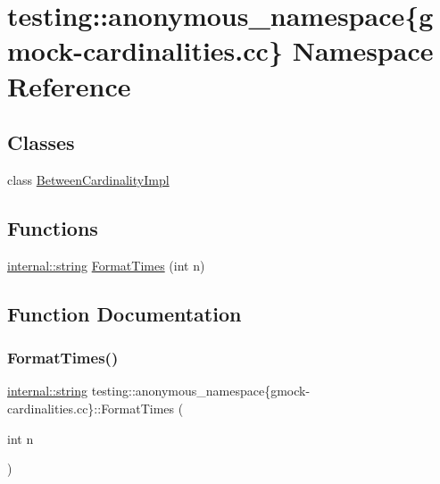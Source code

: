 \hypertarget{namespacetesting_1_1anonymous__namespace_02gmock-cardinalities_8cc_03}{}\section{testing\+:\+:anonymous\+\_\+namespace\{gmock-\/cardinalities.cc\} Namespace Reference}
\label{namespacetesting_1_1anonymous__namespace_02gmock-cardinalities_8cc_03}
\subsection*{Classes}
\begin{DoxyCompactItemize}
\item 
class \hyperlink{classtesting_1_1anonymous__namespace_02gmock-cardinalities_8cc_03_1_1BetweenCardinalityImpl}{Between\+Cardinality\+Impl}
\end{DoxyCompactItemize}
\subsection*{Functions}
\begin{DoxyCompactItemize}
\item 
\hyperlink{namespacetesting_1_1internal_a8e8ff5b11e64078831112677156cb111}{internal\+::string} \hyperlink{namespacetesting_1_1anonymous__namespace_02gmock-cardinalities_8cc_03_a96225757688584c7c21d9a120bc74fd4}{Format\+Times} (int n)
\end{DoxyCompactItemize}


\subsection{Function Documentation}
\mbox{\label{namespacetesting_1_1anonymous__namespace_02gmock-cardinalities_8cc_03_a96225757688584c7c21d9a120bc74fd4}} 
\subsubsection{\texorpdfstring{Format\+Times()}{FormatTimes()}}
{\footnotesize\ttfamily \hyperlink{namespacetesting_1_1internal_a8e8ff5b11e64078831112677156cb111}{internal\+::string} testing\+::anonymous\+\_\+namespace\{gmock-\/cardinalities.\+cc\}\+::Format\+Times (\begin{DoxyParamCaption}\item[{int}]{n }\end{DoxyParamCaption})\hspace{0.3cm}{\ttfamily [inline]}}



